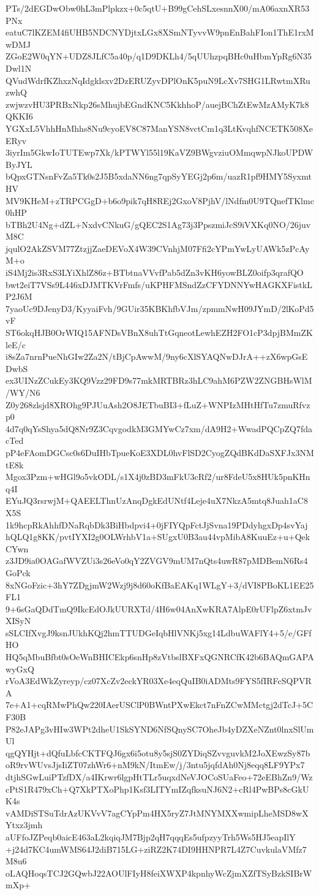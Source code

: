 PTs/2dEGDwObw0hL3mPlpkzx+0c5qtU+B99gCehSLxesnnX00/mA06axnXR53PNx
eatuC7lKZEM4fiUHB5NDCNYDjtxLGx8XSmNTyvvW9pnEnBahFIon1ThE1rxMwDMJ
ZGoE2W0qYN+UDZ8JLfC5a40p/q1D9DKLh4/5qUUhzpqBHc0uHbmYpRg6N35Dwl1N
QVudWdrfKZhxzNqIdgklsxv2DzERUZyvDPlOnK5puN9LcXv7SHG1LRwtmXRuzwhQ
zwjwzvHU3PRBxNkp26sMhujbEGndKNC5KkhhoP/auejBChZtEwMzAMyK7k8QKKI6
YGXxL5VhhHnMhhs8Nu9cyoEV8C87ManYSN8vctCm1q3LtKvqhfNCETK508XeERyv
3iyrIm5GkwIoTUTEwp7Xk/kPTWYl55l19KaVZ9BWgvziuOMmqwpNJkoUPDWByJYL
bQpxGTNsnFvZa5Tk0s2J5B5xdaNN6ng7qpSyYEGj2p6m/uazR1pf9HMY5SyxmtHV
MV9KHeM+zTRPCGgD+b6o9pik7qH8REj2GxoV8PjhV/lNdfm0U9TQnefTKlmc0hHP
bTBh2U4Ng+dZL+NxdvCNkuG/gQEC2S1Ag73j3PpszmiJcS9iVXKq0NO/26juvM8C
jqulO2AkZSVM77ZtzjjZaeDEVoX4W39CVnhjM07Ffi2cYPmYwLyUAWk5zPcAyM+o
iS4Mj2is3RxS3LYiXhlZ86z+BTbtnaVVvfPab5dZn3vKH6yowBLZ0oifp3qrafQO
bwt2eiT7VSs9L446xDJMTKVrFmfs/uKPHFMSndZzCFYDNNYwHAGKXFistkLP2J6M
7yaoUc9DJenyD3/KyyaiFvh/9GUir35KBKhfbVJm/zpmmNwH09JYmD/2lKoPd5vF
ST6okqHJB0OrWIQ15AFNDsVBnX8uhTtGqneotLewhEZH2FO1cP3dpjBMmZKleE/c
i8sZa7nrnPueNhGIw2Za2N/tBjCpAwwM/9ny6cXlSYAQNwDJrA++zX6wpGsEDwbS
ex3UINzZCukEy3KQ9Vzz29FD9s77mkMRTBRz3hLC9ahM6PZW2ZNGBHsWlM/WY/N6
Z0y268zlsjd8XROhg9PJUuAsh2O8JETbuBI3+fLuZ+WNPIzMHtHfTu7zmuRfvzp0
4d7q0qYsShya5dQ8Nr9Z3CqvgodkM3GMYwCz7xm/dA9H2+WwadPQCpZQ7fdacTed
pP4eFAomDGCsc0s6DuIHbTpueKoE3XDL0hvFlSD2CyogZQdBKdDaSXFJx3NMtE8k
Mgox3Pzm+wHGl9o5vkODL/s1X4j0zBD3mFkU3cRf2/ur8FdeU5x8HUk5pnKHnq4I
EYuJQ3rsrwjM+QAEELThnUzAnqDgkEdUNtf4Leje4uX7NkzA5mtq8Juah1aC8X5S
1k9hcpRkAhhfDNaRqbDk3BiHbdpvi4+0jFIYQpFctJjSvna19PDdyhgxDp4svYaj
hQLQ1g8KK/pvtIYXI2g0OLWrhbV1a+SUgxU0B3au44vpMibA8KuuEz+u+QekCYwn
z3JD9ia0OAGafWVZUi3s26eVo0qY2ZVGV9mUM7nQts4uwR87pMDBemN6Rs4GoPck
8xNGoFzic+3hY7ZDgjmW2Wzj9j8d60oKfBaEAKq1WLgY+3/dVI8PBoKL1EE25FL1
9+6sGaQDdTmQ9IkcEdOJkUURXTd/4H6w04AnXwKRA7AlpE0rUFlpZ6xtmJvXISyN
sSLCIfXvgJ9ksnJUkhKQj2hmTTUDGeIqbHlVNKj5xg14LdbuWAFlY4+5/e/GFfHO
HQ5qMbuBfbt0sOeWnBHICEkp6snHp8zVtbslBXFxQGNRCfK42b6BAQmGAPAwyGxQ
rVoA3EdWkZyreyp/cz07XcZv2eckYR03Xe4eqQuIB0iADMts9FYS5fIRFcSQPVRA
7e+A1+cqRMwPhQw220IAerUSClP0BWntPXwEkct7nFnZCwMMctgj2dTcJ+5CF30B
P82eJAPg3vHIw3WPt2dheU1SkSYND6NfSQnySC7OheJb4yDZXeNZnt0lnxSlUmUl
qgQYHjt+dQfuLbfcCKTFQJ6gx6i5otu8y5sjS0ZYDiqSZvvguvkM2JoXEwzSy87b
oR9rvWUvsJjsIiZT07zhWr6+nM9kN/ItmEw/j/3ntu5jqfdAh0Nj8eqq8LF9YPx7
dtjhSGwLuiPTzfDX/a4IKrwr6lgpHtTLr5uqxdNeVJOCoSUaFeo+72eEBhZn9/Wz
cPtS1R479xCh+Q7XkPTXoPhp1Ksf3LITYmIZqfksuNJ6N2+cRl4PwBPs8cGkUK4s
vAMDiSTSuTdrAzUKVvV7agCYpPm4HX5ryZ7JtMNYMXXwmipLheMSD8wXYtxz3jmh
aUFfoJZPeqb0aicE463aL2kqiqJM7Bjp2qH7qqqEs5ufpzyyTrh5Ws5HJ5eapIlY
+j24d7KC4umWMS64J2diB715LG+ziRZ2K74DI9HHNPR7L4Z7CuvkulaVMfz7M8u6
oLAQHoqsTCJ2GQwbJ22AOUlFIyH8feiXWXP4kpnhyWcZjmXZfTSyBzkSIBrWmXp+
